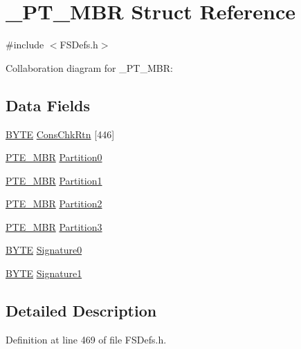 \hypertarget{struct___p_t___m_b_r}{}\section{\+\_\+\+P\+T\+\_\+\+M\+B\+R Struct Reference}
\label{struct___p_t___m_b_r}


{\ttfamily \#include $<$F\+S\+Defs.\+h$>$}



Collaboration diagram for \+\_\+\+P\+T\+\_\+\+M\+B\+R\+:
\subsection*{Data Fields}
\begin{DoxyCompactItemize}
\item 
\hyperlink{_generic_type_defs_8h_a4ae1dab0fb4b072a66584546209e7d58}{B\+Y\+T\+E} \hyperlink{struct___p_t___m_b_r_aa54045cf2751a9149d68e1cdc6fedc16}{Cons\+Chk\+Rtn} \mbox{[}446\mbox{]}
\item 
\hyperlink{struct_p_t_e___m_b_r}{P\+T\+E\+\_\+\+M\+B\+R} \hyperlink{struct___p_t___m_b_r_a750fb2ef9c0ee694f27f46148c1192a0}{Partition0}
\item 
\hyperlink{struct_p_t_e___m_b_r}{P\+T\+E\+\_\+\+M\+B\+R} \hyperlink{struct___p_t___m_b_r_afa47b00264c6cb10a3c4df5a02bd74f9}{Partition1}
\item 
\hyperlink{struct_p_t_e___m_b_r}{P\+T\+E\+\_\+\+M\+B\+R} \hyperlink{struct___p_t___m_b_r_a3e273f4691ec6d7bee66c8a69af0dec7}{Partition2}
\item 
\hyperlink{struct_p_t_e___m_b_r}{P\+T\+E\+\_\+\+M\+B\+R} \hyperlink{struct___p_t___m_b_r_ac98d03fa0976d3921094a9ebaf38f2d5}{Partition3}
\item 
\hyperlink{_generic_type_defs_8h_a4ae1dab0fb4b072a66584546209e7d58}{B\+Y\+T\+E} \hyperlink{struct___p_t___m_b_r_a9b49d812a9060bf0b318a52865b75d7c}{Signature0}
\item 
\hyperlink{_generic_type_defs_8h_a4ae1dab0fb4b072a66584546209e7d58}{B\+Y\+T\+E} \hyperlink{struct___p_t___m_b_r_a39b5beb9c358d4403630e620e017d601}{Signature1}
\end{DoxyCompactItemize}


\subsection{Detailed Description}


Definition at line 469 of file F\+S\+Defs.\+h.



